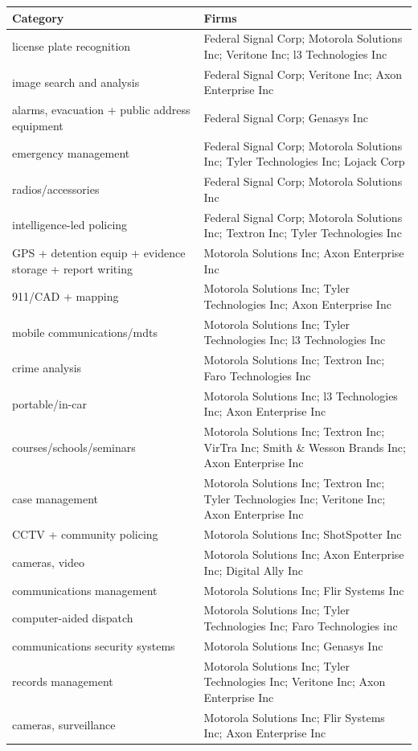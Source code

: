 {\tiny{}}%
\begin{tabular}{ll}
\hline 
{\tiny{}Category} & {\tiny{}Firms}\tabularnewline
\hline 
{\tiny{}license plate recognition} & {\tiny{}Federal Signal Corp; Motorola Solutions Inc; Veritone Inc;
l3 Technologies Inc}\tabularnewline
{\tiny{}image search and analysis} & {\tiny{}Federal Signal Corp; Veritone Inc; Axon Enterprise Inc}\tabularnewline
{\tiny{}alarms, evacuation + public address equipment} & {\tiny{}Federal Signal Corp; Genasys Inc}\tabularnewline
{\tiny{}emergency management} & {\tiny{}Federal Signal Corp; Motorola Solutions Inc; Tyler Technologies
Inc; Lojack Corp}\tabularnewline
{\tiny{}radios/accessories} & {\tiny{}Federal Signal Corp; Motorola Solutions Inc}\tabularnewline
{\tiny{}intelligence-led policing} & {\tiny{}Federal Signal Corp; Motorola Solutions Inc; Textron Inc;
Tyler Technologies Inc}\tabularnewline
{\tiny{}GPS + detention equip + evidence storage + report writing} & {\tiny{}Motorola Solutions Inc; Axon Enterprise Inc}\tabularnewline
{\tiny{}911/CAD + mapping} & {\tiny{}Motorola Solutions Inc; Tyler Technologies Inc; Axon Enterprise
Inc}\tabularnewline
{\tiny{}mobile communications/mdts} & {\tiny{}Motorola Solutions Inc; Tyler Technologies Inc; l3 Technologies
Inc}\tabularnewline
{\tiny{}crime analysis} & {\tiny{}Motorola Solutions Inc; Textron Inc; Faro Technologies Inc}\tabularnewline
{\tiny{}portable/in-car} & {\tiny{}Motorola Solutions Inc; l3 Technologies Inc; Axon Enterprise
Inc}\tabularnewline
{\tiny{}courses/schools/seminars} & {\tiny{}Motorola Solutions Inc; Textron Inc; VirTra Inc; Smith \&
Wesson Brands Inc; Axon Enterprise Inc}\tabularnewline
{\tiny{}case management} & {\tiny{}Motorola Solutions Inc; Textron Inc; Tyler Technologies Inc;
Veritone Inc; Axon Enterprise Inc}\tabularnewline
{\tiny{}CCTV + community policing} & {\tiny{}Motorola Solutions Inc; ShotSpotter Inc}\tabularnewline
{\tiny{}cameras, video} & {\tiny{}Motorola Solutions Inc; Axon Enterprise Inc; Digital Ally
Inc}\tabularnewline
{\tiny{}communications management} & {\tiny{}Motorola Solutions Inc; Flir Systems Inc}\tabularnewline
{\tiny{}computer-aided dispatch} & {\tiny{}Motorola Solutions Inc; Tyler Technologies Inc; Faro Technologies
inc}\tabularnewline
{\tiny{}communications security systems} & {\tiny{}Motorola Solutions Inc; Genasys Inc}\tabularnewline
{\tiny{}records management} & {\tiny{}Motorola Solutions Inc; Tyler Technologies Inc; Veritone Inc;
Axon Enterprise Inc}\tabularnewline
{\tiny{}cameras, surveillance} & {\tiny{}Motorola Solutions Inc; Flir Systems Inc; Axon Enterprise
Inc}\tabularnewline
\hline 
\end{tabular}{\tiny\par}

